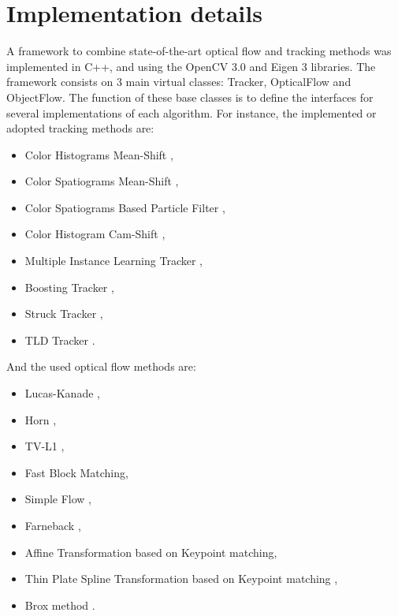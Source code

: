 \section{Implementation details}

A framework to combine state-of-the-art optical flow and tracking methods was implemented in C++, and using the OpenCV 3.0 and Eigen 3 libraries. 
The framework consists on 3 main virtual classes: Tracker, 
OpticalFlow and ObjectFlow. The function of these base classes is to define the interfaces for several implementations of each algorithm. For instance, 
the implemented or adopted tracking methods are:

\begin{itemize}
  \item Color Histograms Mean-Shift \cite{c44},
  \item Color Spatiograms Mean-Shift \cite{c46},
  \item Color Spatiograms Based Particle Filter \cite{c46},
  \item Color Histogram Cam-Shift \cite{c45},
  \item Multiple Instance Learning Tracker \cite{c25},
  \item Boosting Tracker \cite{c47},
  \item Struck Tracker \cite{c23},
  \item TLD Tracker \cite{c48}.
\end{itemize}

And the used optical flow methods are:

\begin{itemize}
  \item Lucas-Kanade \cite{c31},
  \item Horn \cite{c30},
  \item TV-L1 \cite{c32},
  \item Fast Block Matching, 
  \item Simple Flow \cite{c21},
  \item Farneback \cite{c28},
  \item Affine Transformation based on Keypoint matching,
  \item Thin Plate Spline Transformation based on Keypoint matching \cite{c49},
  \item Brox method \cite{c29}.
\end{itemize}

